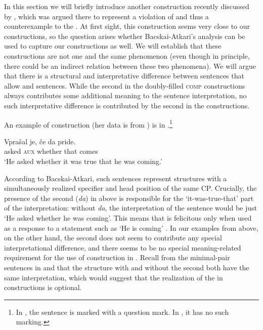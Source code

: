 \documentclass[output=paper,colorlinks,citecolor=brown]{langsci/langscibook}
\begin{document}
In this section we will briefly introduce another  construction recently discussed by \cite{Bacskai2016}, which was argued there to represent a violation of and thus a counterexample to the . At first sight, this construction seems very close to our  constructions, so the question arises whether Bacskai-Atkari’s analysis can be used to capture our  constructions as well. We will establish that these constructions are not one and the same phenomenon (even though in principle, there could be an indirect relation between these two phenomena). We will argue that there is a structural and interpretative difference between  sentences that allow  and   sentences. While the second  in the doubly-filled \textsc{comp} constructions always contributes some additional meaning to the sentence interpretation, no such interpretative difference is contributed by the second  in the  constructions.

An example of    construction (her data is from \citealt{hladnik2010restrictive}) is in .\footnote{In \citet{Bacskai2016}, the sentence is marked with a question mark. In \citet[(15)]{hladnik2010restrictive}, it has no such marking.}

\begin{exe}
\ex \label{ex:plesnicar:fourteen}
\gll Vprašal 	je, 	če 		da 	pride. \\
	asked 		\textsc{aux}	whether	that 	comes \\
\trans `He asked whether it was true that he was coming.'
\end{exe}

\noindent According to Bacskai-Atkari, such sentences represent structures with a simultaneously realized specifier and head position of the same CP. Crucially, the presence of the second  (\textit{da}) in  above is responsible for the `it-was-true-that' part of the interpretation: without \textit{da}, the interpretation of the sentence would be just `He asked whether he was coming'. This means that  is felicitous only when used as a response to a statement such as `He is coming' \citep{Bacskai2016}. In our   examples from above, on the other hand, the second  does not seem to contribute any special interpretational difference, and there seems to be no special meaning-related requirement for the use of  construction in . Recall from the minimal-pair sentences in  and  that the structure with and without the second  both have the same interpretation, which would suggest that the realization of the   in   constructions is optional.
\end{document}
